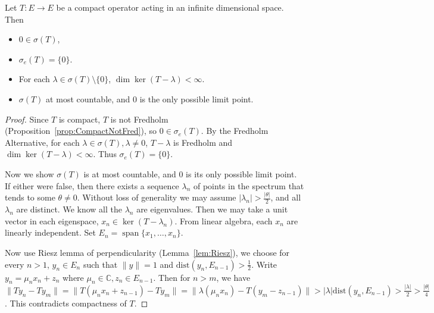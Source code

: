 \begin{theorem}[Riesz]
	\label{thm:RieszCompact}
	Let $T: E \to E$ be a compact operator acting in an infinite dimensional space. Then 
	\begin{itemize}
		\item $0 \in \sigma(T)$, 
\item $\sigma_e(T) = \{0\} $.
\item For each $\lambda \in \sigma(T) \setminus \{0\} $, $\operatorname{dim} \operatorname{ker} (T - \lambda) < \infty $.
\item $\sigma(T)$ at most countable, and $0$ is the only possible limit point.
	\end{itemize}
\end{theorem}
\begin{proof}
	Since $T$ is compact, $T$ is not Fredholm (Proposition~\ref{prop:CompactNotFred}), so $0 \in \sigma_e(T)$. By the Fredholm Alternative, for each $\lambda \in \sigma(T), \lambda\neq 0$, $T - \lambda$ is Fredholm and $\operatorname{dim} \operatorname{ker} (T - \lambda) < \infty $. Thus $\sigma_e(T) = \{0\} $.

	Now we show $\sigma(T)$ is at most countable, and $0$ is its only possible limit point. If either were false, then there exists a sequence $\lambda_n$ of points in the spectrum that tends to some $\theta\neq 0$. Without loss of generality we may assume $|\lambda_n| > \frac{|\theta|}{2}$, and all $\lambda_n$ are distinct. We know all the $\lambda_n$ are eigenvalues. Then we may take a unit vector in each eigenspace, $x_n \in \operatorname{ker} (T - \lambda_n)$. From linear algebra, each $x_n$ are linearly independent. Set $E_n = \operatorname{span } \{x_1, \ldots, x_n\} $.

	Now use Riesz lemma of perpendicularity (Lemma~\ref{lem:Riesz}), we choose for every $n > 1$, $y_n \in E_n$ such that $\|y \| = 1$ and $\text{dist}(y_n, E_{n - 1}) > \frac{1}{2}$. Write $y_n = \mu_n x_n + z_n$ where $\mu_n \in \mathbb{C}, z_n \in E_{n - 1}$. Then for $n > m$, we have $\|T y_n - T y_m\| =\|T (\mu_n x_n + z_{n - 1}) - T y_m\| = \|\lambda (\mu_n x_n) - T(y_m - z_{n - 1})\| > |\lambda| \text{dist}(y_n, E_{n - 1}) > \frac{|\lambda|}{2} > \frac{|\theta|}{4}$. This contradicts compactness of $T$.
\end{proof}

